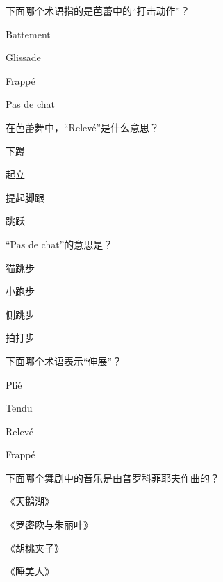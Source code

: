 \documentclass{exam-zh}
\begin{document}
    \begin{question}[points = 2]
    下面哪个术语指的是芭蕾中的“打击动作”？
    \begin{choices}
    \item Battement
    \item Glissade
    \item Frappé
    \item Pas de chat
    \end{choices}
    \end{question}
    
    \begin{question}[points = 2]
    在芭蕾舞中，“Relevé”是什么意思？
    \begin{choices}
    \item 下蹲
    \item 起立
    \item 提起脚跟
    \item 跳跃
    \end{choices}
    \end{question}
    
    \begin{question}[points = 2]
    “Pas de chat”的意思是？
    \begin{choices}
    \item 猫跳步
    \item 小跑步
    \item 侧跳步
    \item 拍打步
    \end{choices}
    \end{question}
    
    \begin{question}[points = 2]
    下面哪个术语表示“伸展”？
    \begin{choices}
    \item Plié
    \item Tendu
    \item Relevé
    \item Frappé
    \end{choices}
    \end{question}
    
    \begin{question}[points = 2]
    下面哪个舞剧中的音乐是由普罗科菲耶夫作曲的？
    \begin{choices}
    \item 《天鹅湖》
    \item 《罗密欧与朱丽叶》
    \item 《胡桃夹子》
    \item 《睡美人》
    \end{choices}
    \end{question}
    
\end{document}
